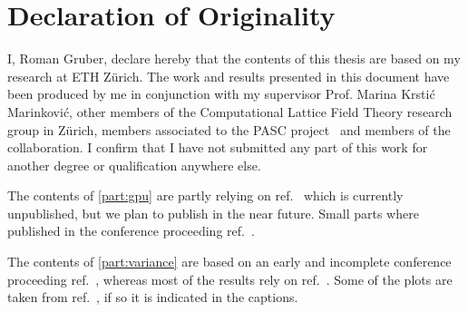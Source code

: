 \begingroup
\let\clearpage\relax
\let\cleardoublepage\relax
\let\cleardoublepage\relax

\chapter*{Declaration of Originality}

I, Roman Gruber, declare hereby that the contents of this thesis are based on my research at ETH Zürich.
The work and results presented in this document have been produced by me in conjunction with my supervisor Prof. Marina Krstić Marinković, other members of the Computational Lattice Field Theory research group in Zürich, members associated to the PASC project~\cite{online:pasc2021} and members of the \RCstar collaboration.
I confirm that I have not submitted any part of this work for another degree or qualification anywhere else.

The contents of \cref{part:gpu} are partly relying on ref.~ which is currently unpublished, but we plan to publish in the near future.
Small parts where published in the conference proceeding ref.~.

The contents of \cref{part:variance} are based on an early and incomplete conference proceeding ref.~, whereas most of the results rely on ref.~.
Some of the plots are taken from ref.~, if so it is indicated in the captions.

\endgroup
